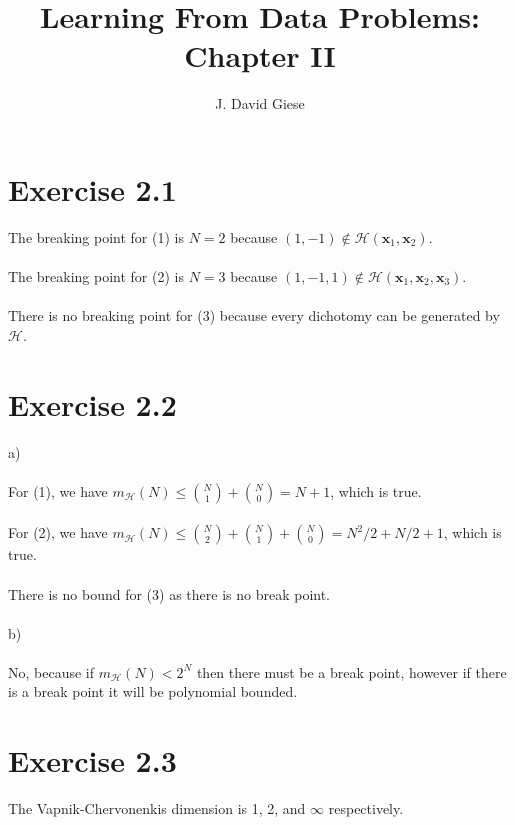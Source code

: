 \documentclass[11pt,letterpaper]{article}
\title{Learning From Data Problems: Chapter II}
\date{}
\author{J. David Giese}
\newcommand{\vv}[1]{\mathbf{#1}} %
\begin{document}
\maketitle

\section*{Exercise 2.1}
The breaking point for (1) is $N = 2$ because $(1, -1) \not\in \mathcal{H}(\vv{x}_1, \vv{x}_2)$.
\\\\
The breaking point for (2) is $N = 3$ because $(1, -1, 1) \not\in \mathcal{H}(\vv{x}_1, \vv{x}_2, \vv{x}_3)$.
\\\\
There is no breaking point for (3) because every dichotomy can be generated by $\mathcal{H}$.

\section*{Exercise 2.2}

a)
\\\\
For (1), we have $m_\mathcal{H}(N) \le \binom{N}{1} + \binom{N}{0} = N + 1$, which is true.
\\\\
For (2), we have $m_\mathcal{H}(N) \le \binom{N}{2} + \binom{N}{1} + \binom{N}{0} = N^2/2 + N/2 + 1$, which is true.
\\\\
There is no bound for (3) as there is no break point.
\\\\
b)
\\\\
No, because if $m_\mathcal{H}(N) < 2^N$ then there must be a break point, however if there is a break point it will be polynomial bounded.

\section*{Exercise 2.3}
The Vapnik-Chervonenkis dimension is 1, 2, and $\infty$ respectively.
\end{document}
